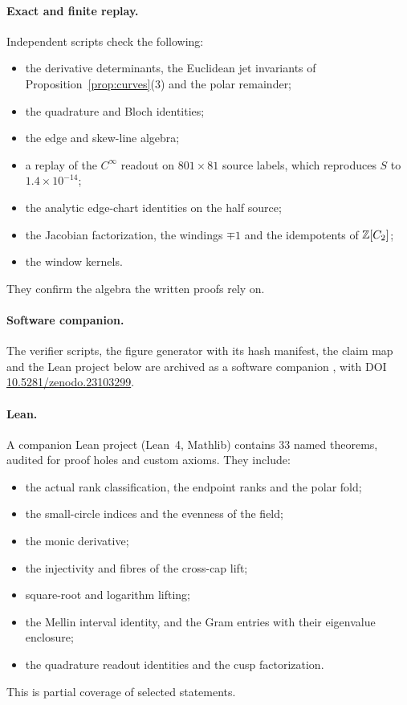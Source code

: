 \documentclass[11pt]{article}
\theoremstyle{definition}\newtheorem{definition}[theorem]{Definition}
\theoremstyle{remark}\newtheorem{remark}[theorem]{Remark}
\begin{document}
\paragraph{Exact and finite replay.} Independent scripts check the following:
\begin{itemize}
\item the derivative determinants, the Euclidean jet invariants of
Proposition~\ref{prop:curves}(3) and the polar remainder;
\item the quadrature and Bloch identities;
\item the edge and skew-line algebra;
\item a replay of the $C^\infty$ readout on $801\times81$ source labels, which
reproduces $S$ to $1.4\times10^{-14}$;
\item the analytic edge-chart identities on the half source;
\item the Jacobian factorization, the windings $\mp1$ and the idempotents of
$\mathbb Z[C_2]$;
\item the window kernels.
\end{itemize}
They confirm the algebra the written proofs rely on.

\paragraph{Software companion.} The verifier scripts, the figure generator with its
hash manifest, the claim map and the Lean project below are archived as a software
companion \cite{software}, with DOI
\href{https://doi.org/10.5281/zenodo.23103299}{10.5281/\allowbreak zenodo.23103299}.

\paragraph{Lean.} A companion Lean project (Lean~4, Mathlib) contains 33 named
theorems, audited for proof holes and custom axioms. They include:
\begin{itemize}
\item the actual rank classification, the endpoint ranks and the polar fold;
\item the small-circle indices and the evenness of the field;
\item the monic derivative;
\item the injectivity and fibres of the cross-cap lift;
\item square-root and logarithm lifting;
\item the Mellin interval identity, and the Gram entries with their eigenvalue
enclosure;
\item the quadrature readout identities and the cusp factorization.
\end{itemize}
This is partial coverage of selected statements.
\end{document}
